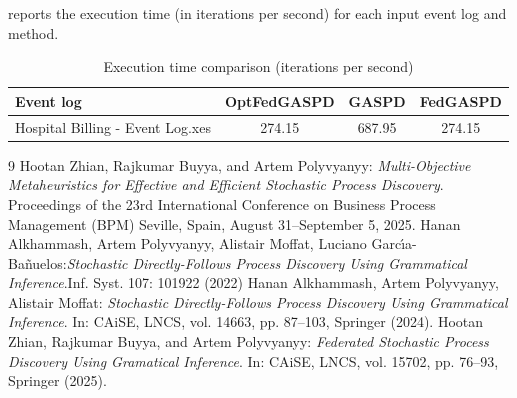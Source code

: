 \documentclass{article}
\begin{document}
\noindent
{} reports the execution time (in iterations per second) for each input event log and method.
\begin{table}[h!]
\centering
\caption{Execution time comparison (iterations per second)}
\label{tbl:execution:time}
\setlength{\tabcolsep}{6pt}
\fontsize{8}{10}\selectfont
\begin{tabular}{lccc}
\toprule
Event log &OptFedGASPD&GASPD&FedGASPD\\
\midrule
Hospital Billing - Event Log.xes&274.15&687.95&274.15\\
\bottomrule
\end{tabular}
\end{table}
\begin{thebibliography}{9}
Hootan Zhian, Rajkumar Buyya, and Artem Polyvyanyy: \emph{Multi-Objective Metaheuristics for Effective and Efficient Stochastic Process Discovery}. Proceedings of the 23rd International Conference on Business Process Management (BPM) Seville, Spain, August 31–September 5, 2025.
Hanan Alkhammash, Artem Polyvyanyy, Alistair Moffat, Luciano Garc{\'{\i}}a{-}Ba{\~{n}}uelos:\emph{Stochastic Directly-Follows Process Discovery Using Grammatical Inference}.Inf. Syst. 107: 101922 (2022)
Hanan Alkhammash, Artem Polyvyanyy, Alistair Moffat: \emph{Stochastic Directly-Follows Process Discovery Using Grammatical Inference}.  In: CAiSE, LNCS, vol. 14663, pp. 87–103, Springer (2024).
Hootan Zhian, Rajkumar Buyya, and Artem Polyvyanyy: \emph{Federated Stochastic Process Discovery Using Gramatical Inference}.  In: CAiSE, LNCS, vol. 15702, pp. 76–93, Springer (2025).\end{thebibliography}
\appendix
\end{document}
